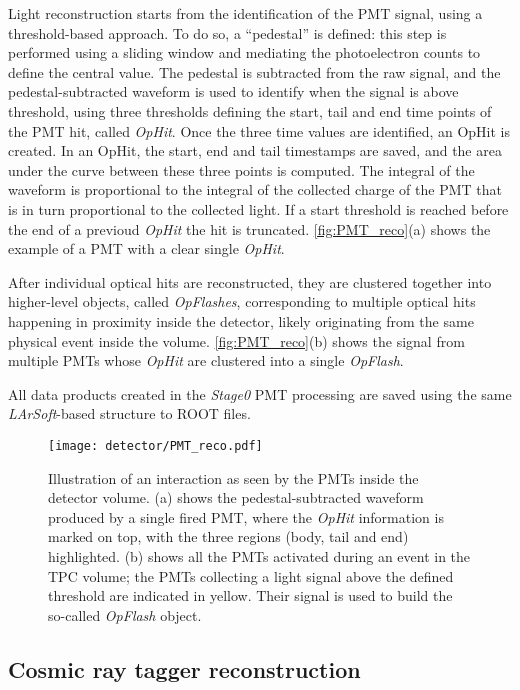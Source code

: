Light reconstruction starts from the identification of the PMT signal, using a threshold-based approach. To do so, a ``pedestal'' is defined: this step is performed using a sliding window and mediating the photoelectron counts to define the central value. The pedestal is subtracted from the raw signal, and the pedestal-subtracted waveform is used to identify when the signal is above threshold, using three thresholds defining the start, tail and end time points of the PMT hit, called \emph{OpHit}. Once the three time values are identified, an OpHit is created. In an OpHit, the start, end and tail timestamps are saved, and the area under the curve between these three points is computed. The integral of the waveform is proportional to the integral of the collected charge of the PMT that is in turn proportional to the collected light. If a start threshold is reached before the end of a previoud \emph{OpHit} the hit is truncated. \autoref{fig:PMT_reco}(a) shows the example of a PMT with a clear single \emph{OpHit}. 

After individual optical hits are reconstructed, they are clustered together into higher-level objects, called \emph{OpFlashes}, corresponding to multiple optical hits happening in proximity inside the detector, likely originating from the same physical event inside the volume. \autoref{fig:PMT_reco}(b) shows the signal from multiple PMTs whose \emph{OpHit} are clustered into a single \emph{OpFlash}.

All data products created in the \emph{Stage0} PMT processing are saved using the same \emph{LArSoft}-based structure to ROOT files. 

\begin{figure}
    \centering
    \texttt{[image: detector/PMT\_reco.pdf]}
    \caption[PMT reconstructed \emph{OpHits}]{Illustration of an interaction as seen by the PMTs inside the detector volume. (a) shows the pedestal-subtracted waveform produced by a single fired PMT, where the \emph{OpHit} information is marked on top, with the three regions (body, tail and end) highlighted. (b) shows all the PMTs activated during an event in the TPC volume; the PMTs collecting a light signal above the defined threshold are indicated in yellow. Their signal is used to build the so-called \emph{OpFlash} object.}
    \label{fig:PMT_reco}
\end{figure}

\subsection{Cosmic ray tagger reconstruction} 

